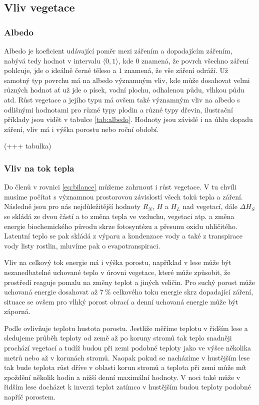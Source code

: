 \subsection{Vliv vegetace} \label{chap:veg}
\subsubsection{Albedo}
Albedo je koeficient udávající poměr mezi zářením a dopadajícím zářením, nabývá tedy hodnot v intervalu $\langle 0,1\rangle$, kde $0$ znamená, že povrch všechno záření pohlcuje, jde o ideálně černé těleso a $1$ znamená, že vše záření odráží. Už samotný typ povrchu má na albedo významným vliv, kde může dosahovat velmi různých hodnot ať už jde o písek, vodní plochu, odhalenou půdu, vlhkou půdu atd. Růst vegetace a jejího typu má ovšem také významným vliv na albedo s odlišnými hodnotami pro různé typy plodin a různé typy dřevin, ilustrační příklady jsou vidět v tabulce \ref{tab:albedo}. Hodnoty jsou závislé i na úhlu dopadu záření, vliv má i výška porostu nebo roční období\cite{arya2001,alma}.

(+++ tabulka)

\subsubsection{Vliv na tok tepla}
Do členů v rovnici \ref{eq:bilance} můžeme zahrnout i růst vegetace. V tu chvíli musíme počítat s významnou prostorovou závislostí všech toků tepla a záření. Následně jsou pro nás nejdůležitější hodnoty $R_N$, $H$ a $H_L$ nad vegetací, dále $\Delta H_S$ se skládá ze dvou částí a to změna tepla ve vzduchu, vegetaci atp. a změna energie biochemického původu skrze fotosyntézu a přesunu oxidu uhličitého. Latentní teplo se pak skládá z výparu a kondenzace vody a také z transpirace vody listy rostlin, mluvíme pak o evapotranspiraci\cite{arya2001}. 

Vliv na celkový tok energie má i výška porostu, například v lese může být nezanedbatelné uchované teplo v úrovni vegetace, které může způsobit, že prostředí reaguje pomalu na změny teplot a jiných veličin. Pro suchý porost může uchovaná energie dosahovat až $\SI{7}{\%}$ celkového toku energie skrz dopadající záření, situace se ovšem pro vlhký porost obrací a denní uchovaná energie může být záporná\cite{alma}. 

Podle \cite{alma} ovlivňuje teplotu hustota porostu. Jestliže měříme teplotu v řidším lese a sledujeme průběh teploty od země až po koruny stromů tak teplo snadněji prochází vegetací a tudíž budou při zemi podobné teploty jako ve výšce několika metrů nebo až v korunách stromů. Naopak pokud se nacházíme v hustějším lese tak bude teplota růst dříve v oblasti korun stromů a teplota při zemi může mít zpoždění několik hodin a nižší denní maximální hodnoty. V noci také může v řidším lese docházet k inverzi teplot zatímco v hustějším budou teploty podobné napříč porostem. 

